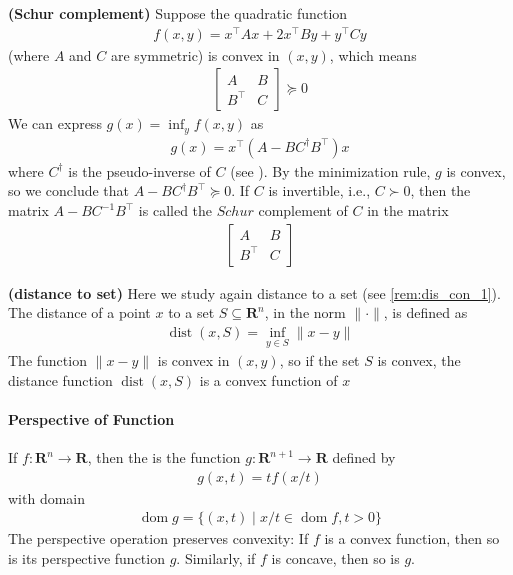 \documentclass{article}
\newcommand{\bfs}[1]{\textbf{({#1}) }}
\newcommand{\dom}{\operatorname{dom}}
\begin{document}
\begin{exma}{\bfs{Schur complement}}
Suppose the quadratic function
\begin{align*}
f(x, y)=x^{\top} A x+2 x^{\top} B y+y^{\top} C y
\end{align*}
(where $A$ and $C$ are symmetric) is convex in $(x, y)$, which means
\begin{align*}
\left[\begin{array}{cc}
A & B \\
B^{\top} & C
\end{array}\right] \succeq 0
\end{align*}
We can express $g(x)=\inf _{y} f(x, y)$ as
\begin{align*}
g(x)=x^{\top}\left(A-B C^{\dagger} B^{\top}\right) x
\end{align*}
where $C^{\dagger}$ is the pseudo-inverse of $C$ (see \cite[A.5.4]{Aharon}). By the minimization rule, $g$ is convex, so we conclude that $A-B C^{\dagger} B^{\top} \succeq 0$.
If $C$ is invertible, i.e., $C \succ 0$, then the matrix $A-B C^{-1} B^{\top}$ is called the $S c h u r$ complement of $C$ in the matrix
\begin{align*}
\left[\begin{array}{cc}
A & B \\
B^{\top} & C
\end{array}\right]
\end{align*}

\end{exma}
\begin{exma}{\bfs{distance to set}}\label{rem:inf_dis} 
Here we study again distance to a set (see \cref{rem:dis_con_1}). The distance of a point $x$ to a set $S \subseteq \mathbf{R}^{n}$, in the norm $\|\cdot\|$, is defined as
\begin{align*}
\operatorname{dist}(x, S)=\inf _{y \in S}\|x-y\|
\end{align*}
The function $\|x-y\|$ is convex in $(x, y)$, so if the set $S$ is convex, the distance function $\operatorname{dist}(x, S)$ is a convex function of $x$
\end{exma} 

\paragraph{Perspective of Function}
If $f: \mathbf{R}^{n} \rightarrow \mathbf{R}$, then the  is the function $g: \mathbf{R}^{n+1} \rightarrow \mathbf{R}$ defined by
\begin{align*}
g(x, t)=t f(x / t)
\end{align*}
with domain
\begin{align*}
\dom  g=\{(x, t) \mid x / t \in \dom  f, t>0\}
\end{align*}
The perspective operation preserves convexity: If $f$ is a convex function, then so is its perspective function $g$. Similarly, if $f$ is concave, then so is $g$.
\end{document}
